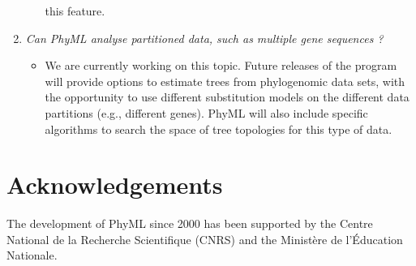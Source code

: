 \documentclass[a4paper,12pt]{article}
\begin{document}
\begin{enumerate}
\begin{itemize}
this feature.
\end{itemize}
\item {\it Can PhyML analyse partitioned data, such as multiple gene sequences ?}\\
\begin{itemize}
\item We are currently  working on this topic.  Future releases of  the program will provide options
to estimate  trees from phylogenomic data sets,  with the opportunity to  use different substitution
models on  the different data partitions (e.g.,  different genes). PhyML will  also include specific
algorithms to search the space of tree topologies for this type of data.
\end{itemize}
\end{enumerate}


\section{Acknowledgements}  
The development of PhyML since 2000 has been supported by the Centre National de la Recherche
Scientifique (CNRS) and the Minist\`ere de l'\'Education Nationale.

% 



\printindex
\end{document}
